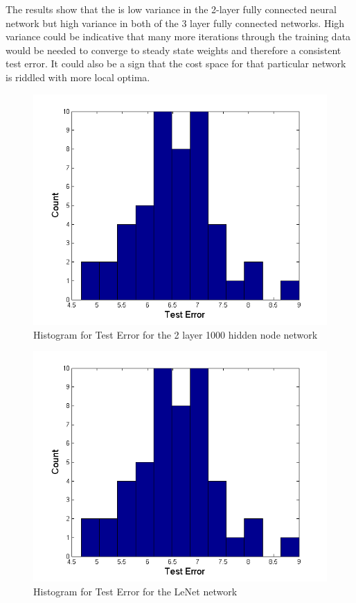\documentclass[12pt, twocolumn]{article}
\begin{document}
The results show that the is low variance in the 2-layer fully connected neural network but high variance in both of the 3 layer fully connected networks. High variance could be indicative that many more iterations through the training data would be needed to converge to steady state weights and therefore a consistent test error. It could also be a sign that the cost space for that particular network is riddled with more local optima.  


\begin{figure}
\includegraphics[scale=.5]{hist2layer.png}
\caption{Histogram for Test Error for the 2 layer 1000 hidden node network}
\label{fig:hist2layer}
\end{figure}

\begin{figure}
	\includegraphics[scale=.5]{hist2layer.png}
	\caption{Histogram for Test Error for the LeNet network}
	\label{fig:histlenet}
\end{figure}
\end{document}
